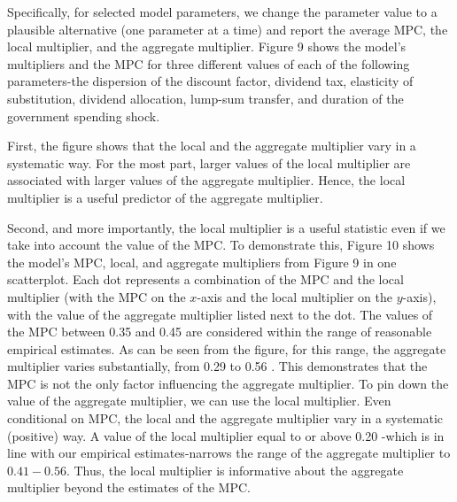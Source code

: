 \documentclass[\latexroot/\projectname]{subfiles}
\begin{document}
Specifically, for selected model parameters, we change the parameter value to a plausible alternative (one parameter at a time) and report the average MPC, the local multiplier, and the aggregate multiplier. Figure 9 shows the model's multipliers and the MPC for three different values of each of the following parameters-the dispersion of the discount factor, dividend tax, elasticity of substitution, dividend allocation, lump-sum transfer, and duration of the government spending shock.

First, the figure shows that the local and the aggregate multiplier vary in a systematic way. For the most part, larger values of the local multiplier are associated with larger values of the aggregate multiplier. Hence, the local multiplier is a useful predictor of the aggregate multiplier.

Second, and more importantly, the local multiplier is a useful statistic even if we take into account the value of the MPC. To demonstrate this, Figure 10 shows the model's MPC, local, and aggregate multipliers from Figure 9 in one scatterplot. Each dot represents a combination of the MPC and the local multiplier (with the MPC on the $x$-axis and the local multiplier on the $y$-axis), with the value of the aggregate multiplier listed next to the dot. The values of the MPC between 0.35 and 0.45 are considered within the range of reasonable empirical estimates. As can be seen from the figure, for this range, the aggregate multiplier varies substantially, from 0.29 to 0.56 . This demonstrates that the MPC is not the only factor influencing the aggregate multiplier. To pin down the value of the aggregate multiplier, we can use the local multiplier. Even conditional on MPC, the local and the aggregate multiplier vary in a systematic (positive) way. A value of the local multiplier equal to or above 0.20 -which is in line with our empirical estimates-narrows the range of the aggregate multiplier to $0.41-0.56$. Thus, the local multiplier is informative about the aggregate multiplier beyond the estimates of the MPC.








\smartbib

\pdfonly{
  \captionsetup[figure]{list=no}
  \captionsetup[table]{list=no}
}
\end{document}
